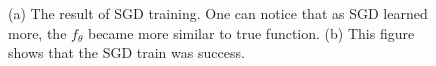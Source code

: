 \documentclass[10pt]{article}
\begin{document}
\begin{figure}[!h]
    \begin{center}
    \end{center}
    \label{fig4}
    \caption{(a) The result of SGD training. One can notice that as SGD learned more, the $f_\theta$ became more similar to true function. (b) This figure shows that the SGD train was success. }
\end{figure}

\appendix
\end{document}
